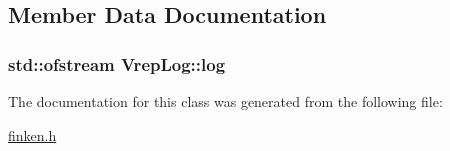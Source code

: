 \subsection{Member Data Documentation}
\subsubsection[{\texorpdfstring{log}{log}}]{\setlength{\rightskip}{0pt plus 5cm}std\+::ofstream Vrep\+Log\+::log\hspace{0.3cm}{\ttfamily [private]}}\hypertarget{classVrepLog_a5c17a8191843eaf3d2743a84901d8e64}{}\label{classVrepLog_a5c17a8191843eaf3d2743a84901d8e64}


The documentation for this class was generated from the following file\+:\begin{DoxyCompactItemize}
\item 
\hyperlink{finken_8h}{finken.\+h}\end{DoxyCompactItemize}
